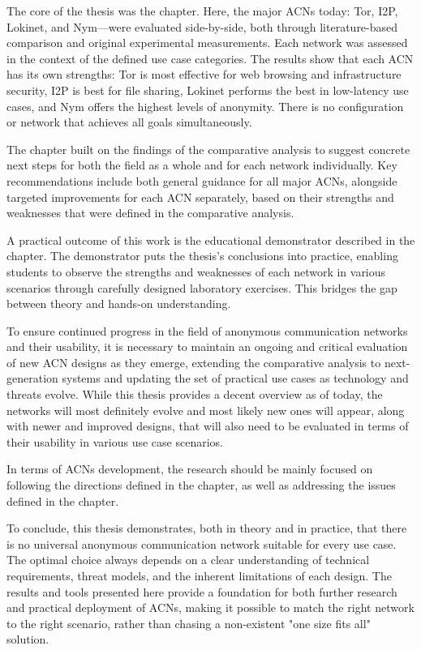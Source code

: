 The core of the thesis was the  chapter. Here, the major ACNs today: Tor, I2P, Lokinet, and Nym—were evaluated side-by-side, both through literature-based comparison and original experimental measurements. Each network was assessed in the context of the defined use case categories. The results show that each ACN has its own strengths: Tor is most effective for web browsing and infrastructure security, I2P is best for file sharing, Lokinet performs the best in low-latency use cases, and Nym offers the highest levels of anonymity. There is no configuration or network that achieves all goals simultaneously.

The  chapter built on the findings of the comparative analysis to suggest concrete next steps for both the field as a whole and for each network individually. Key recommendations include both general guidance for all major ACNs, alongside targeted improvements for each ACN separately, based on their strengths and weaknesses that were defined in the comparative analysis.

A practical outcome of this work is the educational demonstrator described in the  chapter. The demonstrator puts the thesis’s conclusions into practice, enabling students to observe the strengths and weaknesses of each network in various scenarios through carefully designed laboratory exercises. This bridges the gap between theory and hands-on understanding.

To ensure continued progress in the field of anonymous communication networks and their usability, it is necessary to maintain an ongoing and critical evaluation of new ACN designs as they emerge, extending the comparative analysis to next-generation systems and updating the set of practical use cases as technology and threats evolve. While this thesis provides a decent overview as of today, the networks will most definitely evolve and most likely new ones will appear, along with newer and improved designs, that will also need to be evaluated in terms of their usability in various use case scenarios.

In terms of ACNs development, the research should be mainly focused on following the directions defined in the  chapter, as well as addressing the issues defined in the  chapter.

To conclude, this thesis demonstrates, both in theory and in practice, that there is no universal anonymous communication network suitable for every use case. The optimal choice always depends on a clear understanding of technical requirements, threat models, and the inherent limitations of each design. The results and tools presented here provide a foundation for both further research and practical deployment of ACNs, making it possible to match the right network to the right scenario, rather than chasing a non-existent "one size fits all" solution.

